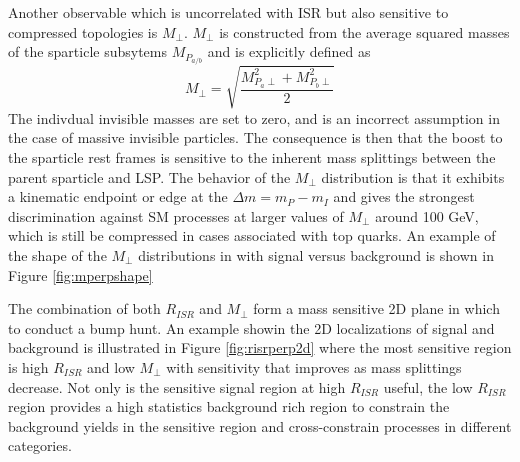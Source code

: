
Another observable which is uncorrelated with ISR but also sensitive to compressed topologies is $M_\perp$. $M_\perp$ is constructed from the average squared masses of the sparticle subsytems $M_{P_{a/b}}$ and is explicitly defined as
\begin{equation}
M_\perp = \sqrt{\frac{M_{P_a\perp}^2 + M_{P_b\perp}^2}{2}}
\end{equation}
The indivdual invisible masses are set to zero, and is an incorrect assumption in the case of massive invisible particles. The consequence is then that the boost to the sparticle rest frames is sensitive to the inherent mass splittings between the parent sparticle and LSP. The behavior of the $M_\perp$ distribution is that it exhibits a kinematic endpoint or edge at the $\Delta m = m_P - m_I$ and gives the strongest discrimination against SM processes at larger values of $M_\perp$ around 100 GeV, which is still be compressed in cases associated with top quarks. An example of the shape of the $M_\perp$ distributions in with signal versus background is shown in Figure \ref{fig:mperpshape}


The combination of both $R_{ISR}$ and $M_\perp$ form a mass sensitive 2D plane in which to conduct a bump hunt. An example showin the 2D localizations of signal and background is illustrated in Figure \ref{fig:risrperp2d} where the most sensitive region is high $R_{ISR}$ and low $M_\perp$ with sensitivity that improves as mass splittings decrease. Not only is the sensitive signal region at high $R_{ISR}$ useful, the low $R_{ISR}$ region provides a high statistics background rich region to constrain the background yields in the sensitive region and cross-constrain processes in different categories. 



